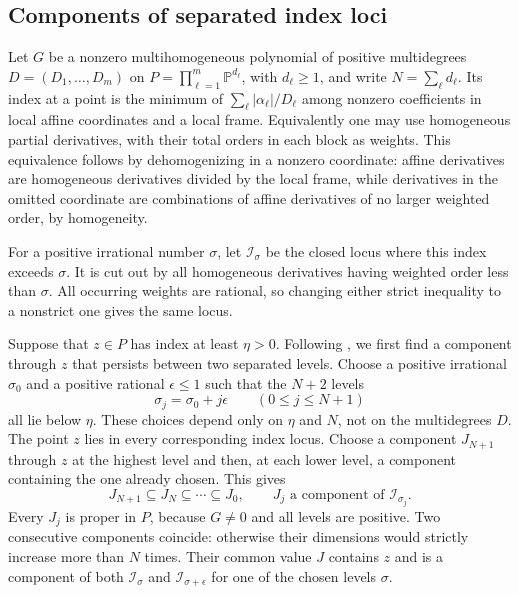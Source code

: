 \subsection{Components of separated index loci}

Let $G$ be a nonzero multihomogeneous polynomial of positive
multidegrees $D=(D_1,\ldots,D_m)$ on
$P=\prod_{\ell=1}^m\mathbb P^{d_\ell}$, with $d_\ell\ge1$, and write
$N=\sum_\ell d_\ell$.  Its index at a point is the minimum of
$\sum_\ell|\alpha_\ell|/D_\ell$ among nonzero coefficients in
local affine coordinates and a local frame.  Equivalently one may
use homogeneous partial derivatives, with their total orders in
each block as weights.  This equivalence follows by dehomogenizing
in a nonzero coordinate: affine derivatives are homogeneous
derivatives divided by the local frame, while derivatives in the
omitted coordinate are combinations of affine derivatives of no
larger weighted order, by homogeneity.

For a positive irrational number $\sigma$, let $\mathcal I_\sigma$
be the closed locus where this index exceeds $\sigma$.  It is cut
out by all homogeneous derivatives having weighted order less than
$\sigma$.  All occurring weights are rational, so changing either
strict inequality to a nonstrict one gives the same locus.

Suppose that $z\in P$ has index at least $\eta>0$.  Following
\cite[Remark~3.4]{Faltings1991}, we first find a component through $z$
that persists between two separated levels.
Choose a positive irrational $\sigma_0$ and a positive rational
$\epsilon\le1$ such that the $N+2$ levels
\[
 \sigma_j=\sigma_0+j\epsilon\qquad(0\le j\le N+1)
\]
all lie below $\eta$.  These choices depend only on $\eta$ and $N$,
not on the multidegrees $D$.  The point $z$ lies in every corresponding
index locus.  Choose a component $J_{N+1}$ through $z$ at the highest
level and then, at each lower level, a component containing the one
already chosen.  This gives
\[
 J_{N+1}\subseteq J_N\subseteq\cdots\subseteq J_0,
 \qquad J_j\text{ a component of }\mathcal I_{\sigma_j}.
\]
Every $J_j$ is proper in $P$, because $G\ne0$ and all levels are
positive.  Two consecutive components coincide: otherwise their
dimensions would strictly increase more than $N$ times.  Their common
value $J$ contains $z$ and is a component of both
$\mathcal I_\sigma$ and $\mathcal I_{\sigma+\epsilon}$ for one of
the chosen levels $\sigma$.

